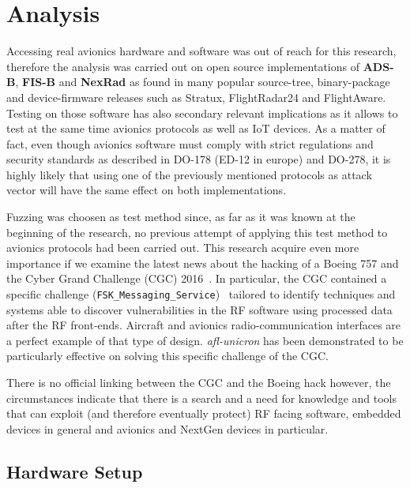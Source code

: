 \documentclass[../main.tex]{subfiles}
\begin{document}
\chapter{Analysis}
\label{chap:experimsetup}

Accessing real avionics hardware and software was out of reach for this research, therefore the analysis was carried out on open source implementations of \textbf{ADS-B}, \textbf{FIS-B} and \textbf{NexRad} as found in many popular source-tree, binary-package and device-firmware releases such as Stratux, FlightRadar24 and FlightAware. Testing on those software has also secondary relevant implications as it allows to test at the same time avionics protocols as well as IoT devices. As a matter of fact, even though avionics software must comply with strict regulations and security standards as described in DO-178 (ED-12 in europe) and DO-278, it is highly likely that using one of the previously mentioned protocols as attack vector will have the same effect on both implementations.

Fuzzing was choosen as test method since, as far as it was known at the beginning of the research, no previous attempt of applying this test method to avionics protocols had been carried out. This research acquire even more importance if we examine the latest news about the hacking of a Boeing 757 and the Cyber Grand Challenge (CGC) 2016~\cite{CGC}. In particular, the CGC contained a specific challenge (\texttt{FSK\_Messaging\_Service})~\cite{CGC-FSK} tailored to identify techniques and systems able to discover vulnerabilities in the RF software using processed data after the RF front-ends. Aircraft and avionics radio-communication interfaces are a perfect example of that type of design.
\textit{afl-unicron} has been demonstrated to be particularly effective on solving this specific challenge of the CGC.

There is no official linking between the CGC and the Boeing hack however, the circumstances indicate that there is a search and a need for knowledge and tools that can exploit (and therefore eventually protect) RF facing software, embedded devices in general and avionics and NextGen devices in particular.


\section{Hardware Setup}
\end{document}
